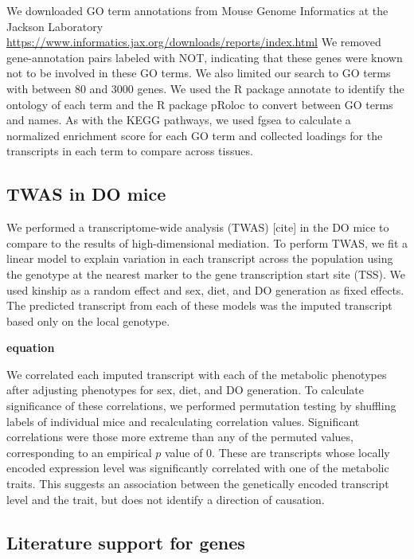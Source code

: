 \documentclass[
]{article}
\begin{document}
We downloaded GO term annotations from Mouse Genome Informatics at the
Jackson Laboratory \cite{pmid33231642}
\url{https://www.informatics.jax.org/downloads/reports/index.html} We
removed gene-annotation pairs labeled with NOT, indicating that these
genes were known not to be involved in these GO terms. We also limited
our search to GO terms with between 80 and 3000 genes. We used the R
package annotate \cite{R_annotate} to identify the ontology of each term
and the R package pRoloc \cite{pmid24413670} to convert between GO terms
and names. As with the KEGG pathways, we used fgsea to calculate a
normalized enrichment score for each GO term and collected loadings for
the transcripts in each term to compare across tissues.

\subsection{TWAS in DO mice}\label{twas-in-do-mice}

We performed a transcriptome-wide analysis (TWAS) {[}cite{]} in the DO
mice to compare to the results of high-dimensional mediation. To perform
TWAS, we fit a linear model to explain variation in each transcript
across the population using the genotype at the nearest marker to the
gene transcription start site (TSS). We used kinship as a random effect
and sex, diet, and DO generation as fixed effects. The predicted
transcript from each of these models was the imputed transcript based
only on the local genotype.

\textbf{equation}

We correlated each imputed transcript with each of the metabolic
phenotypes after adjusting phenotypes for sex, diet, and DO generation.
To calculate significance of these correlations, we performed
permutation testing by shuffling labels of individual mice and
recalculating correlation values. Significant correlations were those
more extreme than any of the permuted values, corresponding to an
empirical \(p\) value of 0. These are transcripts whose locally encoded
expression level was significantly correlated with one of the metabolic
traits. This suggests an association between the genetically encoded
transcript level and the trait, but does not identify a direction of
causation.

\subsection{Literature support for
genes}\label{literature-support-for-genes}
\end{document}
